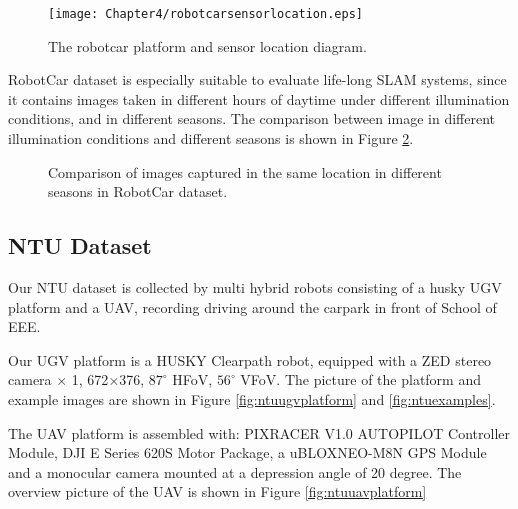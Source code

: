 \begin{figure}[H]
	\centering
	\texttt{[image: Chapter4/robotcarsensorlocation.eps]}
	\caption{The robotcar platform and sensor location diagram.}
	\label{fig:robotcarsensorlocation} 
\end{figure}

RobotCar dataset is especially suitable to evaluate life-long SLAM systems, since it contains images taken in different hours of daytime under different illumination conditions, and in different seasons. The comparison between image in different illumination conditions and different seasons is shown in Figure \ref{fig:robotcarcomparisonseason}.



\begin{figure}
	\centering
	\caption{Comparison of images captured in the same location in different seasons in RobotCar dataset.}
	\label{fig:robotcarcomparisonseason}
\end{figure}
	
\subsection{NTU Dataset}
\label{sec:ntuinfo}
Our NTU dataset is collected by multi hybrid robots consisting of a husky UGV platform and a UAV, recording driving around the carpark in front of School of EEE.

Our UGV platform is a HUSKY Clearpath robot, equipped with a ZED stereo camera $\times$ 1, 672$\times$376, $87^{\circ}$ HFoV, $56^{\circ}$ VFoV. The picture of the platform and example images are shown in Figure \ref{fig:ntuugvplatform} and \ref{fig:ntuexamples}.

The UAV platform is assembled with: PIXRACER V1.0 AUTOPILOT Controller Module, DJI E Series 620S Motor Package, a uBLOXNEO-M8N GPS Module and a monocular camera mounted at a depression angle of 20 degree. The overview picture of the UAV is shown in Figure \ref{fig:ntuuavplatform}

